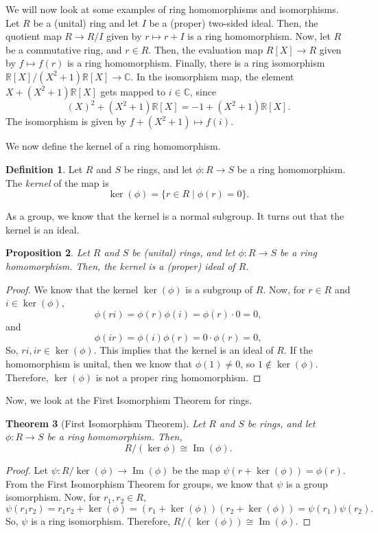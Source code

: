 \documentclass[a4paper, openany]{memoir}
\theoremstyle{definition}
\newtheorem{definition}{Definition}[section]
\theoremstyle{plain}
\newtheorem{theorem}[definition]{Theorem}
\newtheorem{proposition}[definition]{Proposition}
\begin{document}
We will now look at some examples of ring homomorphisms and isomorphisms. Let $R$ be a (unital) ring and let $I$ be a (proper) two-sided ideal. Then, the quotient map $R \to R/I$ given by $r \mapsto r + I$ is a ring homomorphism. Now, let $R$ be a commutative ring, and $r \in R$. Then, the evaluation map $R[X] \to R$ given by $f \mapsto f(r)$ is a ring homomorphism. Finally, there is a ring isomorphism $\mathbb{R}[X]/(X^2 + 1)\mathbb{R}[X] \to \mathbb{C}$. In the isomorphism map, the element $X + (X^2 + 1)\mathbb{R}[X]$ gets mapped to $i \in \mathbb{C}$, since
\[(X)^2 + (X^2 + 1)\mathbb{R}[X] = -1 + (X^2 + 1)\mathbb{R}[X].\]
The isomorphism is given by $f + (X^2 + 1) \mapsto f(i)$.

We now define the kernel of a ring homomorphism.
\begin{definition}
Let $R$ and $S$ be rings, and let $\phi: R \to S$ be a ring homomorphism. The \emph{kernel} of the map is
\[\ker (\phi) = \{r \in R \mid \phi(r) = 0\}.\]
\end{definition}
\noindent As a group, we know that the kernel is a normal subgroup. It turns out that the kernel is an ideal.
\begin{proposition}
Let $R$ and $S$ be (unital) rings, and let $\phi: R \to S$ be a ring homomorphism. Then, the kernel is a (proper) ideal of $R$.
\end{proposition}
\begin{proof}
We know that the kernel $\ker (\phi)$ is a subgroup of $R$. Now, for $r \in R$ and $i \in \ker (\phi)$,
\[\phi(ri) = \phi(r) \phi(i) = \phi(r) \cdot 0 = 0,\]
and
\[\phi(ir) = \phi(i) \phi(r) = 0 \cdot \phi(r) = 0,\]
So, $ri, ir \in \ker (\phi)$. This implies that the kernel is an ideal of $R$. If the homomorphism is unital, then we know that $\phi(1) \neq 0$, so $1 \not\in \ker (\phi)$. Therefore, $\ker (\phi)$ is not a proper ring homomorphism.
\end{proof}
\noindent Now, we look at the First Isomorphism Theorem for rings.
\begin{theorem}[First Isomorphism Theorem]
Let $R$ and $S$ be rings, and let $\phi: R \to S$ be a ring homomorphism. Then,
\[R/(\ker \phi) \cong \operatorname{Im}(\phi).\]
\end{theorem}
\begin{proof}
Let $\psi: R/\ker (\phi) \to \operatorname{Im}(\phi)$ be the map $\psi(r + \ker (\phi)) = \phi(r)$. From the First Isomorphism Theorem for groups, we know that $\psi$ is a group isomorphism. Now, for $r_1, r_2 \in R$,
\[\psi(r_1r_2) = r_1r_2 + \ker (\phi) = (r_1 + \ker(\phi))(r_2 + \ker(\phi)) = \psi(r_1) \psi(r_2).\]
So, $\psi$ is a ring isomorphism. Therefore, $R/(\ker (\phi)) \cong \operatorname{Im}(\phi)$.
\end{proof}
\end{document}

